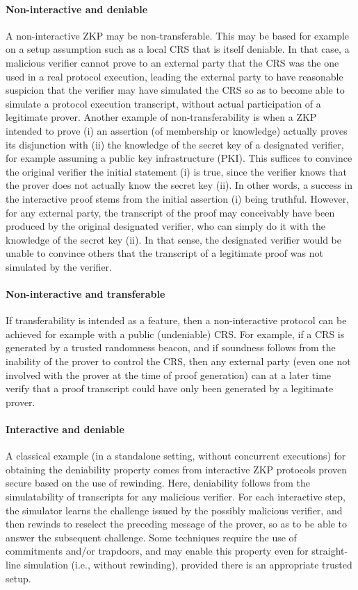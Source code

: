 \paragraph{Non-interactive and deniable} 
A non-interactive ZKP may be non-transferable.
This may be based for example on a setup assumption such as a local CRS that is itself deniable.
In that case, a malicious verifier cannot prove to an external party that the CRS was the one used in a real protocol execution, leading the external party to have reasonable suspicion that the verifier may have simulated the CRS so as to become able to simulate a protocol execution transcript, without actual participation of a legitimate prover.
Another example of non-transferability is when a ZKP intended to prove (i) an assertion (of membership or knowledge) actually proves its disjunction with (ii) the knowledge of the secret key of a designated verifier, for example assuming a public key infrastructure (PKI). 
This suffices to convince the original verifier the initial statement (i) is true, since the verifier knows that the prover does not actually know the secret key (ii).
In other words, a success in the interactive proof stems from the initial assertion (i) being truthful.
However, for any external party, the transcript of the proof may conceivably have been produced by the original designated verifier, who can simply do it with the knowledge of the secret key (ii).
In that sense, the designated verifier would be unable to convince others that the transcript of a legitimate proof was not simulated by the verifier.


\paragraph{Non-interactive and transferable}
If transferability is intended as a feature, then a non-interactive protocol can be achieved for example with a public (undeniable) CRS. 
For example, if a CRS is generated by a trusted randomness beacon, and if soundness follows from the inability of the prover to control the CRS, then any external party (even one not involved with the prover at the time of proof generation) can at a later time verify that a proof transcript could have only been generated by a legitimate prover.


\paragraph{Interactive and deniable}
A classical example (in a standalone setting, without concurrent executions) for obtaining the deniability property comes from interactive ZKP protocols proven secure based on the use of rewinding.
Here, deniability follows from the simulatability of transcripts for any malicious verifier.
For each interactive step, the simulator learns the challenge issued by the possibly malicious verifier, and then rewinds to reselect the preceding message of the prover, so as to be able to answer the subsequent challenge.
Some techniques require the use of commitments and/or trapdoors, and may enable this property even for straight-line simulation (i.e., without rewinding), provided there is an appropriate trusted setup.
\loosen


